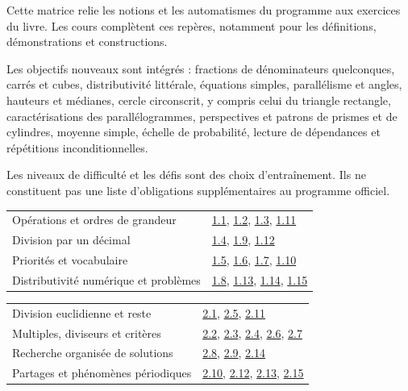 \clearpage{}\label{couverture-programme}\gdef\otChapNum{0}\pagestyle{otFront}
Cette matrice relie les notions et les automatismes du programme aux
exercices du livre. Les cours complètent ces repères, notamment pour les
définitions, démonstrations et constructions.\par\bigskip
Les objectifs nouveaux sont intégrés : fractions de dénominateurs
quelconques, carrés et cubes, distributivité littérale, équations simples,
parallélisme et angles, hauteurs et médianes, cercle circonscrit, y compris
celui du triangle rectangle, caractérisations des parallélogrammes,
perspectives et patrons de prismes et de cylindres, moyenne simple, échelle
de probabilité, lecture de dépendances et répétitions inconditionnelles.\par\bigskip
\begin{attention}Les niveaux de difficulté et les défis sont des choix
d’entraînement. Ils ne constituent pas une liste d’obligations
supplémentaires au programme officiel.\end{attention}\clearpage
{}\fontsize{10}{13}\selectfont
{}\begin{tabularx}{\linewidth}{@{}Yl@{}}\toprule
Opérations et ordres de grandeur & \hyperref[exo-1-1]{1.1}, \hyperref[exo-1-2]{1.2}, \hyperref[exo-1-3]{1.3}, \hyperref[exo-1-11]{1.11}\\[2mm]
Division par un décimal & \hyperref[exo-1-4]{1.4}, \hyperref[exo-1-9]{1.9}, \hyperref[exo-1-12]{1.12}\\[2mm]
Priorités et vocabulaire & \hyperref[exo-1-5]{1.5}, \hyperref[exo-1-6]{1.6}, \hyperref[exo-1-7]{1.7}, \hyperref[exo-1-10]{1.10}\\[2mm]
Distributivité numérique et problèmes & \hyperref[exo-1-8]{1.8}, \hyperref[exo-1-13]{1.13}, \hyperref[exo-1-14]{1.14}, \hyperref[exo-1-15]{1.15}\\[2mm]
\bottomrule\end{tabularx}\par\vspace{4mm}
\begin{tabularx}{\linewidth}{@{}Yl@{}}\toprule
Division euclidienne et reste & \hyperref[exo-2-1]{2.1}, \hyperref[exo-2-5]{2.5}, \hyperref[exo-2-11]{2.11}\\[2mm]
Multiples, diviseurs et critères & \hyperref[exo-2-2]{2.2}, \hyperref[exo-2-3]{2.3}, \hyperref[exo-2-4]{2.4}, \hyperref[exo-2-6]{2.6}, \hyperref[exo-2-7]{2.7}\\[2mm]
Recherche organisée de solutions & \hyperref[exo-2-8]{2.8}, \hyperref[exo-2-9]{2.9}, \hyperref[exo-2-14]{2.14}\\[2mm]
Partages et phénomènes périodiques & \hyperref[exo-2-10]{2.10}, \hyperref[exo-2-12]{2.12}, \hyperref[exo-2-13]{2.13}, \hyperref[exo-2-15]{2.15}\\[2mm]
\bottomrule\end{tabularx}\par\vspace{4mm}
